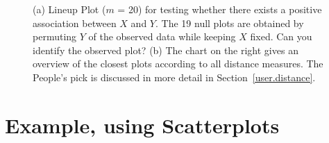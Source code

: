 \begin{figure}[htbp]
{\label{sca_2}
}
\label{sca_lineup}
	\vspace{-.1in}
\caption[Optional caption for list of figures]{(a) Lineup Plot ($m$ = 20) for testing whether there exists a positive association between $X$ and $Y$. The 19 null plots are obtained by permuting $Y$ of the observed data while keeping $X$ fixed. Can you identify the observed plot?  (b) The chart on the right gives an overview of the closest plots according to all distance measures. The People's pick is discussed in more detail in Section~\ref{user.distance}. }
\end{figure}


%
%
%


\section{Example, using Scatterplots} \label{sec:asso}

